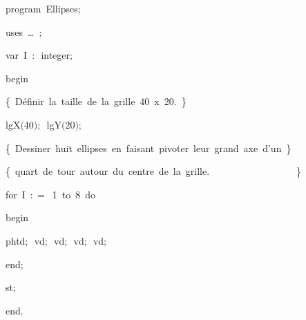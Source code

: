 
{
\parindent {}
\medskip

\carrenoir
\vspace{\neglskip}\mbox{\blc  \idt  \mcl program\idt \ Ellipses$;$
}\par 
\vspace{\neglskip}\mbox{\blc \blk\idt \mcl uses\idt \ \ldots\ $;$
}\par 
\pagebreak[3] 
\vspace{\neglskip}\mbox{\blc  \blk\idt  \mcl var\idt \ I\ $:$\ integer$;$}\par 
\vspace{\neglskip}\mbox{\blc  \idt  \mcl begin\idt }\par 
\vspace{\neglskip}\mbox{\blc  \blk\idt  \cmt  \{\ Définir\ la\ taille\ de\ la\ grille\ 40\ x\ 20.\ \}\idt }\par 
\vspace{\neglskip}\mbox{\blc  \blk\idt  lgX$($40$)$$;$\ lgY$($20$)$$;$}\par 
\vspace{\neglskip}\mbox{\blc  \blk\idt  \cmt  \{\ Dessiner\ huit\ ellipses\ en\ faisant\ pivoter\ leur\ grand\ axe\ d{'}un\ \}\idt }\par 
\vspace{\neglskip}\mbox{\blc  \blk\idt  \cmt  \{\ quart\ de\ tour\ autour\ du\ centre\ de\ la\ grille.\ \ \ \ \ \ \ \ \ \ \ \ \ \ \ \ \ \ \}\idt }\par 
\pagebreak[3] 
\vspace{\neglskip}\mbox{\blc  \blk\idt  \mcl for\idt \ I\ $:$$=$\ 1\ \mcl to\idt \ 8\ \mcl do\idt }\par 
\vspace{\neglskip}\mbox{\blc  \blk\blk\idt  \mcl begin\idt }\par 
\vspace{\neglskip}\mbox{\blc  \blk\blk\blk\idt  phtd$;$\ vd$;$\ vd$;$\ vd$;$\ vd$;$}\par 
\vspace{\neglskip}\mbox{\blc  \blk\blk\idt  \mcl end\idt $;$}\par 
\vspace{\neglskip}\mbox{\blc  \blk\idt  st$;$}\par 
\vspace{\neglskip}\mbox{\blc  \idt  \mcl end\idt $.$}\par 

\medskip }


